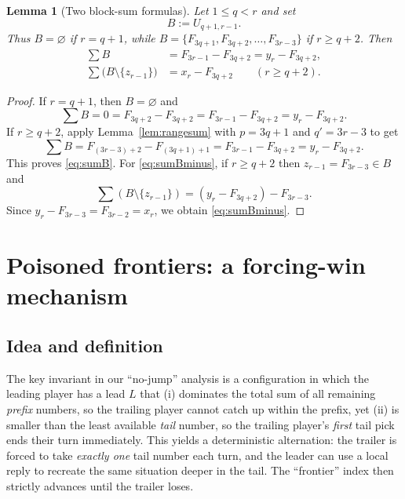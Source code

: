 \documentclass[11pt]{article}
\newtheorem{lemma}[theorem]{Lemma}
\begin{document}
\begin{lemma}[Two block-sum formulas]\label{lem:blocksums}
Let $1\le q<r$ and set
\[
B:=U_{q+1,r-1}.
\]
Thus $B=\varnothing$ if $r=q+1$, while
$B=\{F_{3q+1},F_{3q+2},\dots,F_{3r-3}\}$ if $r\ge q+2$.
Then
\begin{align}
\sum B &= F_{3r-1}-F_{3q+2}=y_r-F_{3q+2}, \label{eq:sumB}\\
\sum\bigl(B\setminus\{z_{r-1}\}\bigr) &= x_r-F_{3q+2}\qquad(r\ge q+2). \label{eq:sumBminus}
\end{align}
\end{lemma}

\begin{proof}
If $r=q+1$, then $B=\varnothing$ and
\[
\sum B=0=F_{3q+2}-F_{3q+2}=F_{3r-1}-F_{3q+2}=y_r-F_{3q+2}.
\]
If $r\ge q+2$, apply Lemma~\ref{lem:rangesum} with $p=3q+1$ and $q'=3r-3$ to get
\[
\sum B = F_{(3r-3)+2}-F_{(3q+1)+1}=F_{3r-1}-F_{3q+2}=y_r-F_{3q+2}.
\]
This proves \eqref{eq:sumB}. For \eqref{eq:sumBminus}, if $r\ge q+2$ then $z_{r-1}=F_{3r-3}\in B$ and
\[
\sum(B\setminus\{z_{r-1}\})=(y_r-F_{3q+2})-F_{3r-3}.
\]
Since $y_r-F_{3r-3}=F_{3r-2}=x_r$, we obtain \eqref{eq:sumBminus}.
\end{proof}

\section{Poisoned frontiers: a forcing-win mechanism}

\subsection{Idea and definition}

The key invariant in our ``no-jump'' analysis is a configuration in which the leading player has a lead $L$
that (i) dominates the total sum of all remaining \emph{prefix} numbers, so the trailing player cannot catch up within the prefix,
yet (ii) is smaller than the least available \emph{tail} number, so the trailing player's \emph{first} tail pick ends their turn immediately.
This yields a deterministic alternation: the trailer is forced to take \emph{exactly one} tail number each turn, and the leader can
use a local reply to recreate the same situation deeper in the tail. The ``frontier'' index then strictly advances until the trailer loses.
\end{document}
